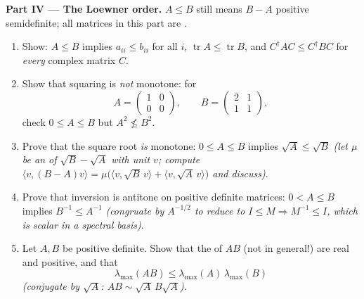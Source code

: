 \begin{problem}
\medskip
\noindent\textbf{Part IV --- The Loewner order.} $A \leq B$
still means $B - A$ positive semidefinite; all matrices in this
part are .
\begin{enumerate}[resume]
  \item Show: $A \leq B$ implies $a_{ii} \leq b_{ii}$ for all
        $i$, $\operatorname{tr} A \leq \operatorname{tr} B$,
        and $C^\dagger AC \leq C^\dagger BC$ for \emph{every}
        complex matrix $C$.
  \item Show that squaring is \emph{not} monotone: for
        \[
        A = \begin{pmatrix} 1 & 0\\ 0 & 0\end{pmatrix},
        \qquad
        B = \begin{pmatrix} 2 & 1\\ 1 & 1\end{pmatrix},
        \]
        check $0 \leq A \leq B$ but $A^2 \not\leq B^2$.
  \item Prove that the square root \emph{is} monotone: $0 \leq
        A \leq B$ implies $\sqrt A \leq \sqrt B$ \emph{(let
        $\mu$ be an  of $\sqrt B - \sqrt A$ with unit
         $v$; compute $\langle v, (B - A)v\rangle =
        \mu\bigl(\langle v, \sqrt B\,v\rangle + \langle v,
        \sqrt A\,v\rangle\bigr)$ and discuss)}.
  \item Prove that inversion is antitone on positive definite
        matrices: $0 < A \leq B$ implies $B^{-1} \leq A^{-1}$
        \emph{(congruate by $A^{-1/2}$ to reduce to $I \leq M
        \Rightarrow M^{-1} \leq I$, which is scalar in a
        spectral basis)}.
  \item Let $A, B$ be positive definite. Show that the
         of $AB$ (not  in general!) are
        real and positive, and that
        \[
        \lambda_{\max}(AB) \leq
        \lambda_{\max}(A)\,\lambda_{\max}(B)
        \]
        \emph{(conjugate by $\sqrt A$: $AB \sim \sqrt
        A\,B\sqrt A$)}.
\end{enumerate}


\end{problem}
